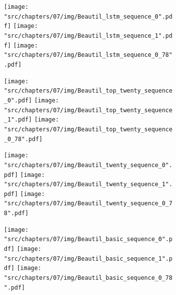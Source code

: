 \begin{figure}[!htbp]
    \begin{subfigure}{\textwidth}
        \texttt{[image: "src/chapters/07/img/Beautil\_lstm\_sequence\_0".pdf]}
        \texttt{[image: "src/chapters/07/img/Beautil\_lstm\_sequence\_1".pdf]}
        \texttt{[image: "src/chapters/07/img/Beautil\_lstm\_sequence\_0\_78".pdf]}
    \end{subfigure}
    \begin{subfigure}{\textwidth}
        \texttt{[image: "src/chapters/07/img/Beautil\_top\_twenty\_sequence\_0".pdf]}
        \texttt{[image: "src/chapters/07/img/Beautil\_top\_twenty\_sequence\_1".pdf]}
        \texttt{[image: "src/chapters/07/img/Beautil\_top\_twenty\_sequence\_0\_78".pdf]}
    \end{subfigure}
    \begin{subfigure}{\textwidth}
        \texttt{[image: "src/chapters/07/img/Beautil\_twenty\_sequence\_0".pdf]}
        \texttt{[image: "src/chapters/07/img/Beautil\_twenty\_sequence\_1".pdf]}
        \texttt{[image: "src/chapters/07/img/Beautil\_twenty\_sequence\_0\_78".pdf]}
    \end{subfigure}
    \begin{subfigure}{\textwidth}
        \texttt{[image: "src/chapters/07/img/Beautil\_basic\_sequence\_0".pdf]}
        \texttt{[image: "src/chapters/07/img/Beautil\_basic\_sequence\_1".pdf]}
        \texttt{[image: "src/chapters/07/img/Beautil\_basic\_sequence\_0\_78".pdf]}
    \end{subfigure}
\end{figure}

